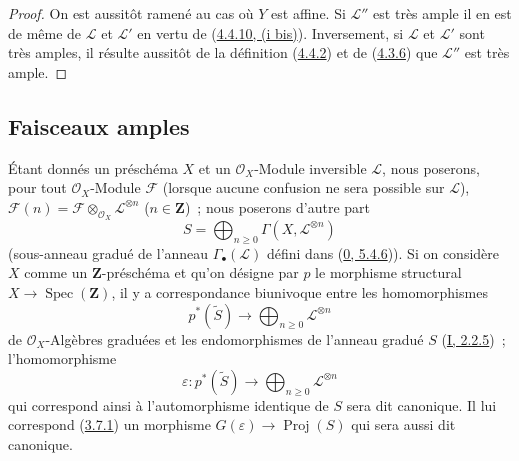 \begin{proof}
On est aussitôt ramené au cas où $Y$ est affine. Si $\mathcal{L}''$ est très
ample il en est de même de $\mathcal{L}$ et $\mathcal{L}'$ en vertu de
(\hyperref[II.4.4.10-fr]{4.4.10, (i bis)}). Inversement, si $\mathcal{L}$ et
$\mathcal{L}'$ sont très amples, il résulte aussitôt de la définition
(\hyperref[II.4.4.2-fr]{4.4.2}) et de
(\hyperref[II.4.3.6-fr]{4.3.6}) que $\mathcal{L}''$ est très ample.
\end{proof}

\subsection{Faisceaux amples}
\label{subsection:II.4.5-fr}

\begin{env}[4.5.1]
\label{II.4.5.1-fr}
Étant donnés un préschéma $X$ et un $\mathcal{O}_X$-Module inversible
$\mathcal{L}$, nous poserons, pour tout $\mathcal{O}_X$-Module $\mathcal{F}$
(lorsque aucune confusion ne sera possible sur $\mathcal{L}$),
$\mathcal{F}(n)=\mathcal{F}\otimes_{\mathcal{O}_X}\mathcal{L}^{\otimes n}$
($n\in\mathbf{Z}$)~; nous poserons d'autre part
\[
  S=\bigoplus_{n\geq0}\Gamma(X,\mathcal{L}^{\otimes n})
\]
(sous-anneau gradué de l'anneau $\Gamma_\bullet(\mathcal{L})$ défini dans
(\hyperref[0.5.4.6-fr]{0, 5.4.6})). Si on considère $X$ comme un
$\mathbf{Z}$-préschéma et qu'on désigne par $p$ le morphisme structural
$X\to\operatorname{Spec}(\mathbf{Z})$, il y a correspondance biunivoque
entre les homomorphismes
\[
  p^*(\widetilde{S})\longrightarrow
  \bigoplus_{n\geq0}\mathcal{L}^{\otimes n}
\]
de $\mathcal{O}_X$-Algèbres graduées et les endomorphismes de l'anneau gradué
$S$ (\hyperref[I.2.2.5-fr]{I, 2.2.5})~; l'homomorphisme
\[
  \varepsilon:p^*(\widetilde{S})\longrightarrow
  \bigoplus_{n\geq0}\mathcal{L}^{\otimes n}
\]
qui correspond ainsi à l'automorphisme identique de $S$ sera dit canonique.
Il lui correspond (\hyperref[II.3.7.1-fr]{3.7.1}) un morphisme
$G(\varepsilon)\to\operatorname{Proj}(S)$ qui sera aussi dit canonique.
\end{env}

